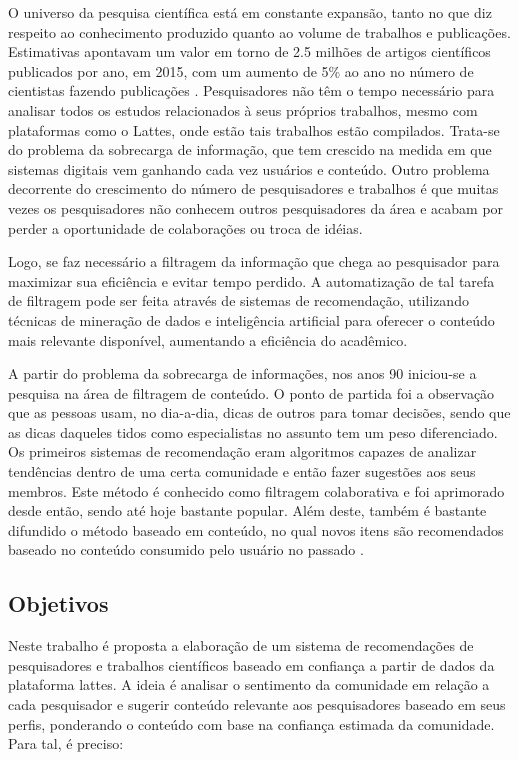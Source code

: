 \documentclass[12pt]{article}
\begin{document}
O universo da pesquisa científica está em constante expansão, tanto no que diz respeito ao conhecimento 
produzido quanto ao volume de trabalhos e publicações. Estimativas apontavam um valor em torno de 2.5 
milhões de artigos científicos publicados por ano, em 2015, com um aumento de 5\% ao ano no número de 
cientistas fazendo publicações \cite{ware2015stm}. Pesquisadores não têm o tempo necessário para analisar 
todos os estudos relacionados à seus próprios trabalhos, mesmo com plataformas como o Lattes, onde estão 
tais trabalhos estão compilados. Trata-se do problema da sobrecarga de informação, que tem crescido na 
medida em que sistemas digitais vem ganhando cada vez usuários e conteúdo. Outro problema decorrente do 
crescimento do número de pesquisadores e trabalhos é que muitas vezes os pesquisadores não conhecem outros 
pesquisadores da área e acabam por perder a oportunidade de colaborações ou troca de idéias.

Logo, se faz necessário a filtragem da informação que chega ao pesquisador para maximizar sua eficiência e 
evitar tempo perdido. A automatização de tal tarefa de filtragem pode ser feita através de sistemas de recomendação, 
utilizando técnicas de mineração de dados e inteligência artificial para oferecer o conteúdo mais relevante 
disponível, aumentando a eficiência do acadêmico. 

A partir do problema da sobrecarga de informações, nos anos 90 iniciou-se a pesquisa na área de filtragem de conteúdo. 
O ponto de partida foi a observação que as pessoas usam, no dia-a-dia, dicas de outros para tomar decisões, sendo que 
as dicas daqueles tidos como especialistas no assunto tem um peso diferenciado. Os primeiros sistemas de recomendação 
eram algoritmos capazes de analizar tendências dentro de uma certa comunidade e então fazer sugestões aos seus membros. 
Este método é conhecido como filtragem colaborativa e foi aprimorado desde então, sendo até hoje bastante popular. Além 
deste, também é bastante difundido o método baseado em conteúdo, no qual novos itens são recomendados baseado no 
conteúdo consumido pelo usuário no passado \cite{ricci2011introduction}.

\subsection{Objetivos}

Neste trabalho é proposta a elaboração de um sistema de recomendações de pesquisadores e trabalhos científicos baseado 
em confiança a partir de dados da plataforma lattes. A ideia é analisar o sentimento da comunidade em relação a cada
pesquisador e sugerir conteúdo relevante aos pesquisadores baseado em seus perfis, ponderando o conteúdo com base na 
confiança estimada da comunidade. Para tal, é preciso:
\end{document}
